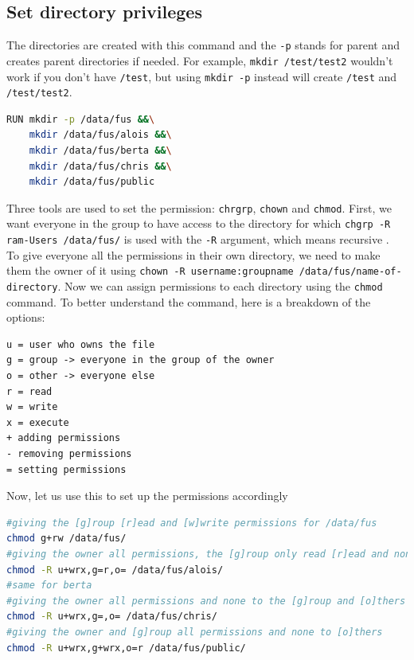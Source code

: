 \documentclass[a4paper]{article}
\newcommand{\abc}{\hfill \break}
\begin{document}
\subsection {Set directory privileges}
The directories are created with this command and the \texttt{-p} stands for parent and creates parent directories if needed. For example, \texttt{mkdir /test/test2} wouldn't work if you don't have \texttt{/test}, but using \texttt{mkdir -p} instead will create \texttt{/test} and \texttt{/test/test2}.
\begin{lstlisting}[language=bash]
RUN mkdir -p /data/fus &&\
    mkdir /data/fus/alois &&\
    mkdir /data/fus/berta &&\
    mkdir /data/fus/chris &&\
    mkdir /data/fus/public
\end{lstlisting}
Three tools are used to set the permission: \texttt{chrgrp}, \texttt{chown} and \texttt{chmod}. \abc
First, we want everyone in the group to have access to the directory for which \texttt{chgrp -R ram-Users /data/fus/} is used with the \texttt{-R} argument, which means recursive \cite{perms,chgrp}.
\\To give everyone all the permissions in their own directory, we need to make them the owner of it using \texttt{chown -R username:groupname /data/fus/name-of-directory}.\cite{chown} \abc
Now we can assign permissions to each directory using the \texttt{chmod}\cite{chmod} command. \abc
To better understand the command, here is a breakdown of the options: \abc
\begin{lstlisting}
u = user who owns the file
g = group -> everyone in the group of the owner
o = other -> everyone else
r = read
w = write
x = execute
+ adding permissions
- removing permissions
= setting permissions
\end{lstlisting} \cite{chmod}
Now, let us use this to set up the permissions accordingly
\begin{lstlisting}[language=bash]
#giving the [g]roup [r]ead and [w]write permissions for /data/fus
chmod g+rw /data/fus/
#giving the owner all permissions, the [g]roup only read [r]ead and none to [o]thers
chmod -R u+wrx,g=r,o= /data/fus/alois/
#same for berta
#giving the owner all permissions and none to the [g]roup and [o]thers
chmod -R u+wrx,g=,o= /data/fus/chris/ 
#giving the owner and [g]roup all permissions and none to [o]thers
chmod -R u+wrx,g+wrx,o=r /data/fus/public/
\end{lstlisting} \cite{chmod}
\end{document}
